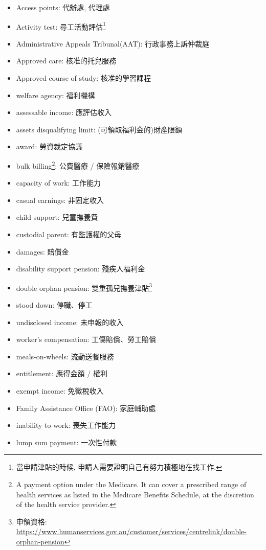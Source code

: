 \begin{multicols}{2}
\begin{itemize}
  \itemsep0em
  \item Access points: 代辦處, 代理處
  \item Activity test: 尋工活動評估\footnote{當申請津貼的時候, 申請人需要證明自己有努力積極地在找工作.}
  \item Administrative Appeals Tribunal(AAT): 行政事務上訴仲裁庭
  \item Approved care: 核准的托兒服務
  \item Approved course of study: 核准的學習課程
  \item welfare agency: 福利機構
  \item assessable income: 應評估收入
  \item assets disqualifying limit: (可領取福利金的)財產限額
  \item award: 勞資裁定協議
  \item bulk billing\footnote{A payment option under the Medicare. It can cover a prescribed range of health services as listed in the Medicare Benefits Schedule, at the discretion of the health service provider.}: 公費醫療 / 保險報銷醫療
  \item capacity of work: 工作能力
  \item casual earnings: 非固定收入
  \item child support: 兒童撫養費
  \item custodial parent: 有監護權的父母
  \item damages: 賠償金
  \item disability support pension: 殘疾人福利金
  \item double orphan pension: 雙重孤兒撫養津貼\footnote{申領資格: \url{https://www.humanservices.gov.au/customer/services/centrelink/double-orphan-pension}}
  \item stood down: 停職、停工
  \item undisclosed income: 未申報的收入
  \item worker's compensation: 工傷賠償、勞工賠償
  \item meals-on-wheels: 流動送餐服務
  \item entitlement: 應得金額 / 權利
  \item exempt income: 免徵稅收入
  \item Family Assistance Office (FAO): 家庭輔助處
  \item inability to work: 喪失工作能力
  \item lump sum payment: 一次性付款

\end{itemize}
\end{multicols}
